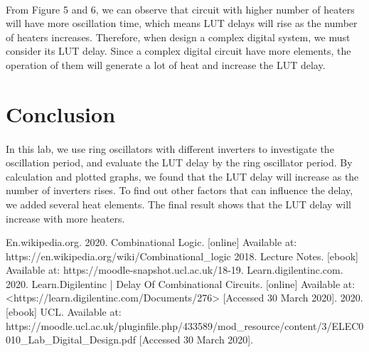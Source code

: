 \documentclass[12pt]{article}
\begin{document}
    \paragraph{}
    From Figure 5 and 6, we can observe that circuit with higher number of heaters will have more oscillation time, which means LUT delays will rise as the number of heaters increases. Therefore, when design a complex digital system, we must consider its LUT delay. Since a complex digital circuit have more elements, the operation of them will generate a lot of heat and increase the LUT delay.
    
    
    \section{Conclusion}
    \paragraph{}
    In this lab, we use ring oscillators with different inverters to investigate the oscillation period, and evaluate the LUT delay by the ring oscillator period. By calculation and plotted graphs, we found that the LUT delay will increase as the number of inverters rises. To find out other factors that can influence the delay, we added several heat elements. The final result shows that the LUT delay will increase with more heaters.
    
    
    
    
    
    
    \newpage   
    \begin{thebibliography}{}
     En.wikipedia.org. 2020. Combinational Logic. [online] Available at: https://en.wikipedia.org/wiki/Combinational\_logic
    2018. Lecture Notes. [ebook] Available at: https://moodle-snapshot.ucl.ac.uk/18-19.
    Learn.digilentinc.com. 2020. Learn.Digilentinc | Delay Of Combinational Circuits. [online] Available at: <https://learn.digilentinc.com/Documents/276> [Accessed 30 March 2020].
    2020. [ebook] UCL. Available at: https://moodle.ucl.ac.uk/pluginfile.php/433589/mod\_resource/content/3/ELEC0010\_Lab\_Digital\_Design.pdf [Accessed 30 March 2020].
    \end{thebibliography}
    
    
    
\end{document}

